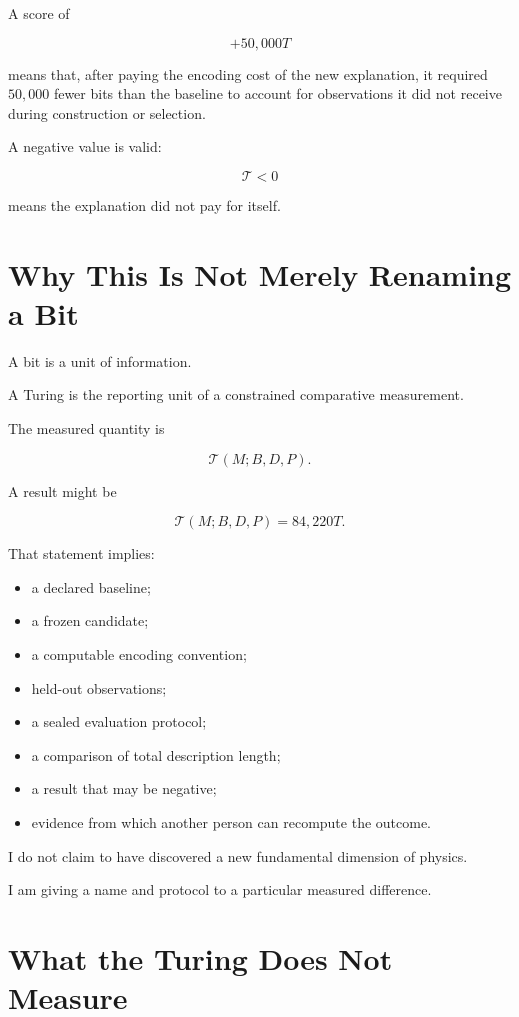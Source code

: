 \documentclass[11pt]{article}
\begin{document}
A score of

\[
+50{,}000T
\]

means that, after paying the encoding cost of the new explanation, it required \(50{,}000\) fewer bits than the baseline to account for observations it did not receive during construction or selection.

A negative value is valid:

\[
\mathcal{T}<0
\]

means the explanation did not pay for itself.

\section{Why This Is Not Merely Renaming a Bit}

A bit is a unit of information.

A Turing is the reporting unit of a constrained comparative measurement.

The measured quantity is

\[
\mathcal{T}(M;B,D,P).
\]

A result might be

\[
\mathcal{T}(M;B,D,P)
=
84{,}220T.
\]

That statement implies:

\begin{itemize}
    \item a declared baseline;
    \item a frozen candidate;
    \item a computable encoding convention;
    \item held-out observations;
    \item a sealed evaluation protocol;
    \item a comparison of total description length;
    \item a result that may be negative;
    \item evidence from which another person can recompute the outcome.
\end{itemize}

I do not claim to have discovered a new fundamental dimension of physics.

I am giving a name and protocol to a particular measured difference.

\section{What the Turing Does Not Measure}
\end{document}
